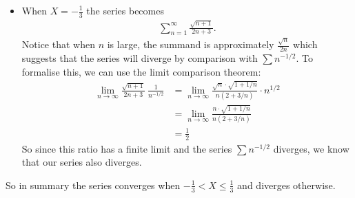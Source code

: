 \begin{eg}[$\sum_{n=1}^\infty \frac{ (-3)^n \sqrt{n+1}}{2n+3}X^n$]
\begin{itemize}
\item When $X = -\frac{1}{3}$ the series becomes
\begin{align*}
\sum_{n=1}^\infty \frac{\sqrt{n+1}}{2n+3}.
\end{align*}
Notice that when $n$ is large, the summand is approximately
$\frac{\sqrt{n}}{2n}$ which suggests that the series will diverge
by comparison with $\sum n^{-1/2}$. To formalise this, we can use the limit comparison theorem:
\begin{align*}
  \lim_{n \to \infty} \frac{\sqrt{n+1}}{2n+3}\  \frac{1}{ n^{-1/2} }
  &=
  \lim_{n \to \infty} \frac{\sqrt{n} \cdot \sqrt{1+1/n}}{n(2+3/n)} \cdot n^{1/2}\\
  &=
  \lim_{n \to \infty} \frac{n \cdot \sqrt{1+1/n}}{n(2+3/n)} \\
  &= \frac{1}{2}
\end{align*}
So since this ratio has a finite limit and the series $\sum n^{-1/2}$ diverges, we know that our series also diverges.
\end{itemize}
So in summary the series converges when $-\frac{1}{3} < X \leq \frac{1}{3}$ and diverges otherwise.
\end{eg}

